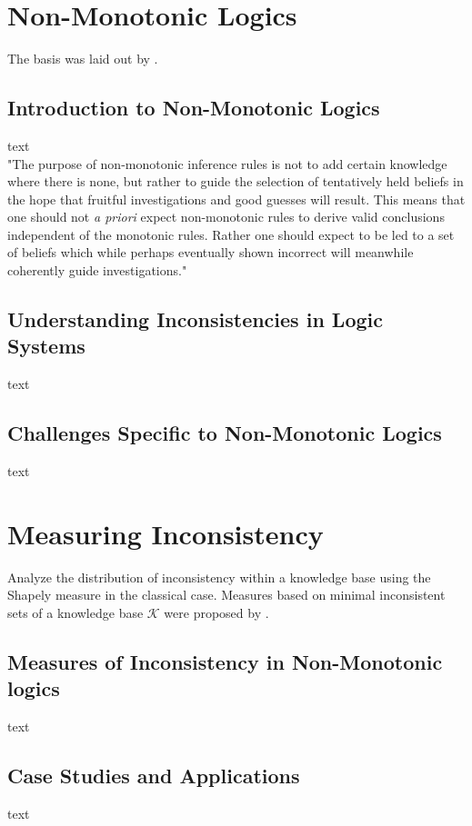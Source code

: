 \section{Non-Monotonic Logics}
The basis was laid out by \cite{mcdermott_non-monotonic_1980}.

\subsection{Introduction to Non-Monotonic Logics}
text\\
"The purpose of non-monotonic inference rules is not to add certain knowledge where there is none, but rather to guide the selection of tentatively held beliefs in the hope that fruitful investigations and good guesses will result. This means that one should not \textit{a priori} expect non-monotonic rules to derive valid conclusions independent of the monotonic rules. Rather one should expect to be led to a set of beliefs which while perhaps eventually shown incorrect will meanwhile coherently guide investigations."\\
\cite[p. 46]{mcdermott_non-monotonic_1980}

\subsection{Understanding Inconsistencies in Logic Systems}
text

\subsection{Challenges Specific to Non-Monotonic Logics}
text

\section{Measuring Inconsistency}
Analyze the distribution of inconsistency within a knowledge base using the Shapely measure \cite{hunter_measure_2010} in the classical case. Measures based on minimal inconsistent sets of a knowledge base \(\mathcal{K}\) \cite{jabbour_mis_2016} were proposed by \cite{ulbricht_measuring_2018}.

\subsection{Measures of Inconsistency in Non-Monotonic logics}
text

\subsection{Case Studies and Applications}
text


